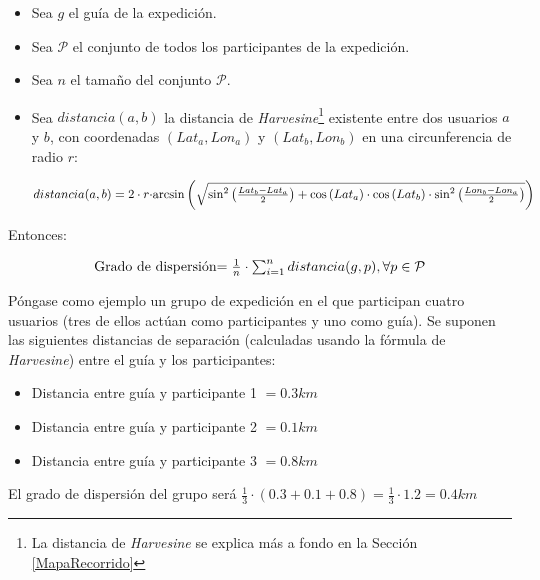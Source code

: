 \begin{itemize}
\item Sea $g$ el guía de la expedición.
\item Sea $\mathcal{P}$ el conjunto de todos los participantes de la expedición.
\item Sea $n$ el tamaño del conjunto $\mathcal{P}$.
\item Sea $distancia(a, b)$ la distancia de \textit{Harvesine}\footnote{La distancia de \textit{Harvesine} se explica más a fondo en la Sección \ref{MapaRecorrido}} existente entre dos usuarios $a$ y $b$, con coordenadas $(Lat_a, Lon_a)$ y $(Lat_b, Lon_b)$ en una circunferencia de radio $r$:\\
\begin{center}
\begin{equation}
distancia(a,b) = 2\cdot r \cdot $ \\ $\arcsin{\left( \sqrt{\sin^2\left(\frac{Lat_b - Lat_a}{2} \right) + \cos \left( Lat_a \right) \cdot \cos \left( Lat_b \right) \cdot \sin^2 \left( \frac{Lon_b - Lon_a}{2} \right)}\right)}
\end{equation}
\end{center}
\end{itemize}

Entonces:

\begin{center}
\begin{equation}
$Grado de dispersión$ = \frac{1}{n} \cdot \sum_{i=1}^{n}distancia(g, p), \forall p \in \mathcal{P}
\end{equation}
\end{center}

Póngase como ejemplo un grupo de expedición en el que participan cuatro usuarios (tres de ellos actúan como participantes y uno como guía). Se suponen las siguientes distancias de separación (calculadas usando la fórmula de \textit{Harvesine}) entre el guía y los participantes:

\begin{itemize}
\item Distancia entre guía y participante 1 $= 0.3km$
\item Distancia entre guía y participante 2 $= 0.1km$
\item Distancia entre guía y participante 3 $= 0.8km$
\end{itemize}

El grado de dispersión del grupo será $\frac{1}{3} \cdot (0.3 + 0.1 + 0.8) = \frac{1}{3} \cdot 1.2 = 0.4km$

